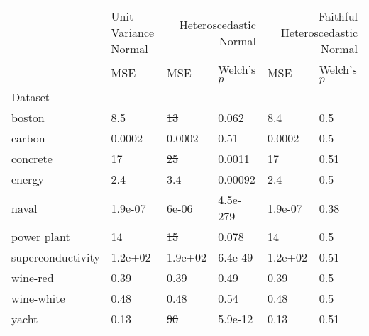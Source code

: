 \begin{tabular}{l|l|ll|ll}
\toprule
 & Unit Variance Normal & \multicolumn{2}{r}{Heteroscedastic Normal} & \multicolumn{2}{r}{Faithful Heteroscedastic Normal} \\
 & MSE & MSE & Welch's $p$ & MSE & Welch's $p$ \\
Dataset &  &  &  &  &  \\
\midrule
boston & 8.5 & \sout{13} & 0.062 & 8.4 & 0.5 \\
carbon & 0.0002 & 0.0002 & 0.51 & 0.0002 & 0.5 \\
concrete & 17 & \sout{25} & 0.0011 & 17 & 0.51 \\
energy & 2.4 & \sout{3.4} & 0.00092 & 2.4 & 0.5 \\
naval & 1.9e-07 & \sout{6e-06} & 4.5e-279 & 1.9e-07 & 0.38 \\
power plant & 14 & \sout{15} & 0.078 & 14 & 0.5 \\
superconductivity & 1.2e+02 & \sout{1.9e+02} & 6.4e-49 & 1.2e+02 & 0.51 \\
wine-red & 0.39 & 0.39 & 0.49 & 0.39 & 0.5 \\
wine-white & 0.48 & 0.48 & 0.54 & 0.48 & 0.5 \\
yacht & 0.13 & \sout{90} & 5.9e-12 & 0.13 & 0.51 \\
\bottomrule
\end{tabular}
